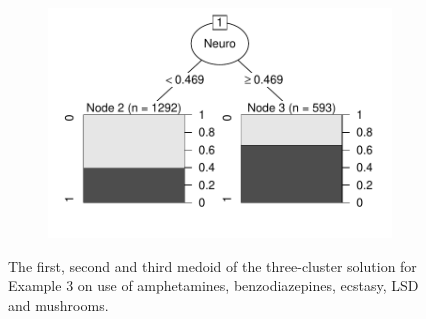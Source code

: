 \begin{figure}[H]
\begin{subfigure}[t]{.49\textwidth}
	\includegraphics[width=\linewidth, trim=0 20 0 0, clip]{MO_M3.pdf}
	\caption{}
\end{subfigure}
	\caption{The first, second and third medoid of the three-cluster solution for Example 3 on use of amphetamines, benzodiazepines, ecstasy, LSD and mushrooms.}
	\label{fig:Ex3Medoids}
\end{figure}


